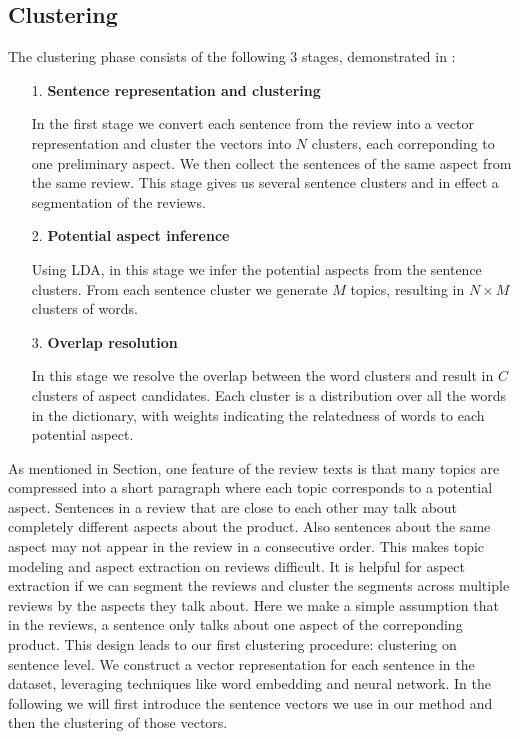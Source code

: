 \subsection{Clustering}
\label{sec:clustering}



The clustering phase consists of the following 3 stages, 
demonstrated in :
\begin{itemize}
	\item[1.] \textbf{Sentence representation and clustering}

In the first stage we convert each sentence from the review into a vector
representation and cluster the vectors into $N$ clusters, 
each correponding to one preliminary aspect. We then collect the 
sentences of the same aspect from the same review. 
This stage gives us several sentence clusters and 
in effect a segmentation of the reviews.

	\item[2.] \textbf{Potential aspect inference}

		Using LDA, in this stage we infer the potential aspects from the sentence clusters. From each sentence cluster we generate $M$ topics, resulting in $N\times M$ clusters of words.

	\item[3.] \textbf{Overlap resolution}

		In this stage we resolve the overlap between the word clusters and result in $C$ clusters of aspect candidates. Each cluster is a distribution over all the words in the dictionary, with weights indicating the relatedness of words to each potential aspect.
\end{itemize}

As mentioned in Section, one feature of the review texts is that many topics are compressed into a short paragraph where each topic corresponds to a potential aspect. Sentences in a review that are close to each other may talk about completely different aspects about the product. Also sentences about the same aspect may not appear in the review in a consecutive order. This makes topic modeling and aspect extraction on reviews difficult. 
It is helpful for aspect extraction if we can segment the reviews and cluster the segments across multiple reviews by the aspects they talk about. Here we make a simple assumption that in the reviews, a sentence only talks about one aspect of the correponding product.
This design leads to our first clustering procedure: clustering on sentence level. We construct a vector representation for each sentence in the dataset, leveraging techniques like word embedding and neural network. In the following we will first introduce the sentence vectors we use in our method and then the clustering of those vectors.

